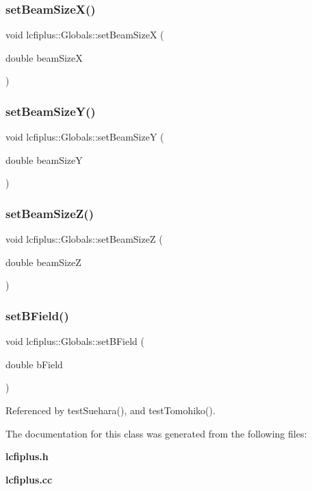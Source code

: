\subsubsection{set\+Beam\+Size\+X()}
{\footnotesize\ttfamily void lcfiplus\+::\+Globals\+::set\+Beam\+SizeX (\begin{DoxyParamCaption}\item[{double}]{beam\+SizeX }\end{DoxyParamCaption})\hspace{0.3cm}{\ttfamily [inline]}}

\mbox{\label{classlcfiplus_1_1Globals_a7edcb5115b9eec2254b672d705fcfe5d}} 
\subsubsection{set\+Beam\+Size\+Y()}
{\footnotesize\ttfamily void lcfiplus\+::\+Globals\+::set\+Beam\+SizeY (\begin{DoxyParamCaption}\item[{double}]{beam\+SizeY }\end{DoxyParamCaption})\hspace{0.3cm}{\ttfamily [inline]}}

\mbox{\label{classlcfiplus_1_1Globals_a55ce01b6a5b9379bf5bc7c15b10a4ae3}} 
\subsubsection{set\+Beam\+Size\+Z()}
{\footnotesize\ttfamily void lcfiplus\+::\+Globals\+::set\+Beam\+SizeZ (\begin{DoxyParamCaption}\item[{double}]{beam\+SizeZ }\end{DoxyParamCaption})\hspace{0.3cm}{\ttfamily [inline]}}

\mbox{\label{classlcfiplus_1_1Globals_a2f1e028e3a16c774be7f91ea0915c02d}} 
\subsubsection{set\+B\+Field()}
{\footnotesize\ttfamily void lcfiplus\+::\+Globals\+::set\+B\+Field (\begin{DoxyParamCaption}\item[{double}]{b\+Field }\end{DoxyParamCaption})\hspace{0.3cm}{\ttfamily [inline]}}



Referenced by test\+Suehara(), and test\+Tomohiko().



The documentation for this class was generated from the following files\+:\begin{DoxyCompactItemize}
\item 
\textbf{ lcfiplus.\+h}\item 
\textbf{ lcfiplus.\+cc}\end{DoxyCompactItemize}
